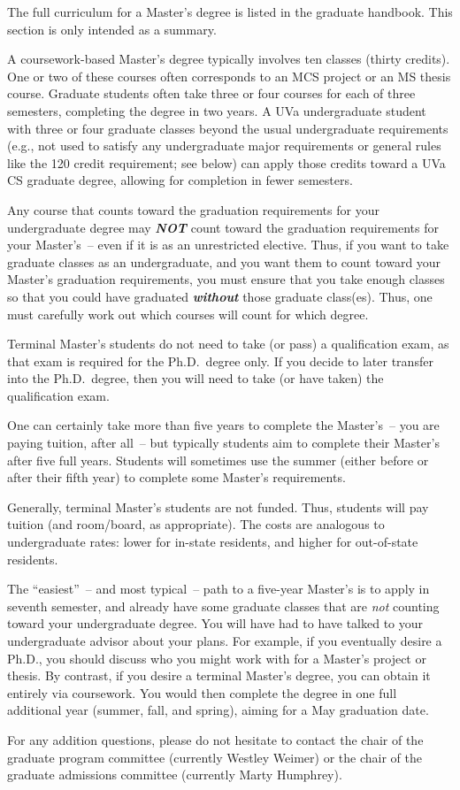 The full curriculum for a Master's degree is listed in the graduate
handbook.
This section is only intended as a summary.

A coursework-based Master's degree typically involves ten classes (thirty
credits). One or two of these courses often corresponds to an MCS project
or an MS thesis course.  Graduate students often take three or four courses
for each of three semesters, completing the degree in two years. A UVa
undergraduate student with three or four graduate classes beyond the usual
undergraduate requirements (e.g., not used to satisfy any undergraduate
major requirements or general rules like the 120 credit requirement; see
below) can apply those credits toward a UVa CS graduate degree, allowing
for completion in fewer semesters. 

Any course that counts toward the graduation requirements for your
undergraduate degree may {\em\bf NOT} count toward the graduation
requirements for your Master's~-- even if it is as an unrestricted
elective.  Thus, if you want to take graduate classes as an undergraduate,
and you want them to count toward your Master's graduation requirements,
you must ensure that you take enough classes so that you could have
graduated {\em\bf without} those graduate class(es).  Thus, one must
carefully work out which courses will count for which degree. 

Terminal Master's students do not need to take (or pass) a qualification
exam, as that exam is required for the Ph.D.\ degree only.  If you decide
to later transfer into the Ph.D.\ degree, then you will need to take (or
have taken) the qualification exam.

One can certainly take more than five years to complete the Master's~--
you are paying tuition, after all~-- but typically students aim to
complete their Master's after five full years. Students will sometimes use
the summer (either before or after their fifth year) to complete some
Master's requirements.  


Generally, terminal Master's students are not funded.  Thus, students will
pay tuition (and room/board, as appropriate).  The costs are analogous to
undergraduate rates: lower for in-state residents, and higher for
out-of-state residents.

The ``easiest''~-- and most typical~-- path to a five-year Master's is to
apply in seventh semester, and already have some graduate classes that are
\emph{not} counting toward your undergraduate degree. You will have had to
have talked to your undergraduate advisor about your plans. For example,
if you eventually desire a Ph.D., you should discuss who you might work
with for a Master's project or thesis. By contrast, if you desire a
terminal Master's degree, you can obtain it entirely via coursework. 
You would then complete the degree in one full additional year (summer,
fall, and spring), aiming for a May graduation date.

For any addition questions, please do not hesitate to contact the chair of
the graduate program committee (currently Westley Weimer) or the chair of
the graduate admissions committee (currently Marty Humphrey).
